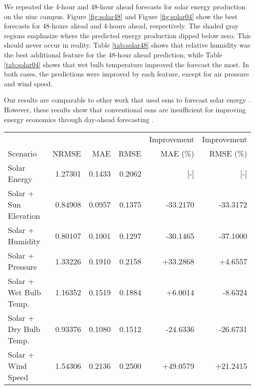We repeated the 4-hour and 48-hour ahead forecasts for solar energy production
on the \gls{uiuc} campus. Figure \ref{fig:solar48} and Figure \ref{fig:solar04}
show the best forecasts for 48-hours ahead and 4-hours ahead, respectively. The
shaded gray regions emphasize where the predicted energy production dipped
below zero. This should never occur in reality. Table \ref{tab:solar48} shows
that relative humidity was the best additional feature for the 48-hour ahead
prediction, while Table \ref{tab:solar04} shows that wet bulb temperature
improved the forecast the most. In both cases, the predictions were improved
by each feature, except for air pressure and wind speed.

Our results are comparable to other work that used \glspl{esn} to forecast
solar energy \cite{li_echo_2019}.
However, these results show that conventional \glspl{esn} are insufficient for
improving energy economics through day-ahead forecasting
\cite{brancucci_martinez-anido_value_2016}.

\begin{figure*}[h]
  \centering
  
  \caption{The optimized 48-hour ahead solar energy prediction. The inputs for
  this forecast were solar energy and relative humidity.
  : Reservoir Size: 800, Sparsity: 0.2, Spectral Radius:
  1.5, Noise: 0.0001, Training Length: 5000, Prediction Window: 48, Random
  state: 85}
  \label{fig:solar48}
\end{figure*}
  \begin{table*}[h]
    \centering
    \caption{Tabulated error for 48-hour ahead solar energy forecasts with various coupled quantities. Improvement indicates the percentage improvement over the base case of forecasting solar energy alone.}
    \label{tab:solar48}
    \begin{tabular}{l|r|r|r|r|r}
      & & & & Improvement & Improvement \\
      Scenario &NRMSE & MAE & RMSE & MAE (\%) & RMSE (\%)\\
      \hline
      Solar Energy & 1.27301 & 0.1433 &0.2062 & [-] & [-] \\
      Solar + Sun Elevation & 0.84908 & 0.0957 & 0.1375 &  -33.2170 & -33.3172 \\
      Solar + Humidity & 0.80107 & 0.1001 & 0.1297 & -30.1465 & -37.1000 \\
      Solar + Pressure & 1.33226 & 0.1910 & 0.2158 & +33.2868 & +4.6557 \\
      Solar + Wet Bulb Temp. & 1.16352 & 0.1519 & 0.1884 & +6.0014 & -8.6324 \\
      Solar + Dry Bulb Temp. & 0.93376 & 0.1080 & 0.1512 & -24.6336 & -26.6731 \\
      Solar + Wind Speed & 1.54306 & 0.2136 & 0.2500 & +49.0579 & +21.2415 \\
    \end{tabular}
  \end{table*}
